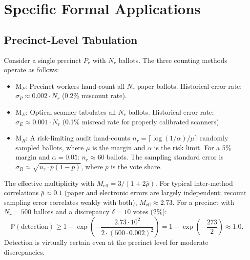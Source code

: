 \documentclass[11pt,a4paper]{article}
\theoremstyle{definition}
\newcommand{\Pbb}{\mathbb{P}}
\newcommand{\method}[1]{\mathrm{M}_{#1}}
\begin{document}
\section{Specific Formal Applications}
\label{sec:applications}
\subsection{Precinct-Level Tabulation}
Consider a single precinct $P_r$ with $N_r$ ballots. The three counting methods operate as follows:
\begin{itemize}
    \item $\method{P}$: Precinct workers hand-count all $N_r$ paper ballots. Historical error rate: $\sigma_P \approx 0.002 \cdot N_r$ (0.2\% miscount rate).
    \item $\method{E}$: Optical scanner tabulates all $N_r$ ballots. Historical error rate: $\sigma_E \approx 0.001 \cdot N_r$ (0.1\% misread rate for properly calibrated scanners).
    \item $\method{R}$: A risk-limiting audit hand-counts $n_r = \lceil \log(1/\alpha) / \mu \rceil$ randomly sampled ballots, where $\mu$ is the margin and $\alpha$ is the risk limit. For a 5\% margin and $\alpha = 0.05$: $n_r \approx 60$ ballots. The sampling standard error is $\sigma_R \approx \sqrt{n_r \cdot p(1-p)}$, where $p$ is the vote share.
\end{itemize}
The effective multiplicity with $M_{\text{eff}} = 3 / (1 + 2\bar{\rho})$. For typical inter-method correlations $\bar{\rho} \approx 0.1$ (paper and electronic errors are largely independent; recount sampling error correlates weakly with both), $M_{\text{eff}} \approx 2.73$. For a precinct with $N_r = 500$ ballots and a discrepancy $\delta = 10$ votes (2\%):
\begin{equation}
    \Pbb(\text{detection}) \geq 1 - \exp\left(-\frac{2.73 \cdot 10^2}{2 \cdot (500 \cdot 0.002)^2}\right) = 1 - \exp\left(-\frac{273}{2}\right) \approx 1.0.
    \label{eq:precinct_example}
\end{equation}
Detection is virtually certain even at the precinct level for moderate discrepancies.
\end{document}
